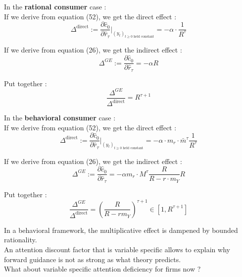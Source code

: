 \documentclass{beamer}
\begin{document}
\begin{frame}{\subsecname}
    In the \textbf{rational consumer} case : \\

    If we derive from equation (52), we get the direct effect : 
    \begin{equation*}
        \Delta^{\text{direct}}:=\frac{\partial \hat{c}_{0}}{\partial \hat{r}_{\tau}}\bigg\rvert_{(y_{t})_{t\geq0 \text{ held constant}}} = -\alpha\cdot \frac{1}{R^{\tau}}
    \end{equation*}
    
    If we derive from equation (26), we get the indirect effect :
    \begin{equation*}
        \Delta^{GE}:=\frac{\partial \hat{c}_{0}}{\partial \hat{r}_{\tau}}=-\alpha R 
    \end{equation*}

    Put together : 
    \begin{equation}\tag{53}
        \frac{\Delta^{GE}}{\Delta^{\text{direct}}}=R^{\tau+1}
    \end{equation}
\end{frame}

\begin{frame}{\subsecname}
    In the \textbf{behavioral consumer} case : \\

    If we derive from equation (52), we get the direct effect : 
    \begin{equation*}
        \Delta^{\text{direct}}:=\frac{\partial \hat{c}_{0}}{\partial \hat{r}_{\tau}}\bigg\rvert_{(y_{t})_{t\geq0 \text{ held constant}}} = -\alpha\cdot m_{r}\cdot\bar{m}^{\tau}\frac{1}{R^{\tau}}
    \end{equation*}

    If we derive from equation (26), we get the indirect effect :
    \begin{equation*}
        \Delta^{GE}:=\frac{\partial \hat{c}_{0}}{\partial \hat{r}_{\tau}}=-\alpha m_{r}\cdot M^{\tau} \frac{R}{R-r\cdot m_{Y}}R 
    \end{equation*}

    Put together : 
    \begin{equation}\tag{54}
        \frac{\Delta^{GE}}{\Delta^{\text{direct}}}=\left(\frac{R}{R-rm_{Y}}\right)^{\tau+1}\in\left[1, R^{\tau+1}\right]
    \end{equation}
\end{frame}

\begin{frame}{\subsecname}
    In a behavioral framework, the multiplicative effect is dampened by bounded rationality. \\

    An attention discount factor that is variable specific allows to explain why forward guidance is not as strong as what theory predicts. \\ 

    What about variable specific attention deficiency for firms now ?
\end{frame}
\end{document}
